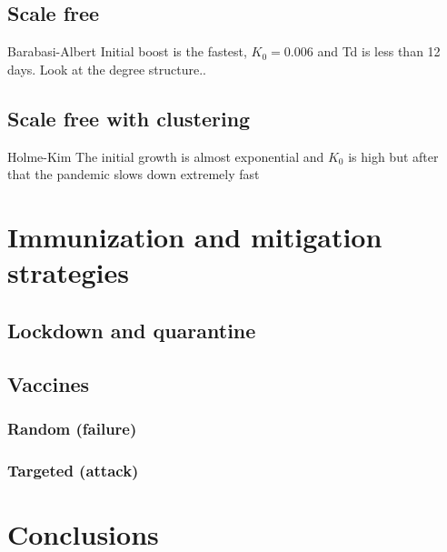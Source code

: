 \documentclass[DIV=12, BCOR=0pt]{scrartcl}  %
\begin{document}
  \subsection{Scale free}
  Barabasi-Albert
  Initial boost is the fastest, $K_0=0.006$ and Td is less than 12 days. Look at the degree structure..
  
  
  \subsection{Scale free with clustering}
  Holme-Kim
  The initial growth is almost exponential and $K_0$ is high but after that the pandemic slows down extremely fast
  
  
  
  
  
  
  \section{Immunization and mitigation strategies}
  \subsection{Lockdown and quarantine}
  \subsection{Vaccines}
  \subsubsection{Random (failure)}
	\subsubsection{Targeted (attack)}

	\section{Conclusions}

		
  \footnotesize
	
\end{document}
